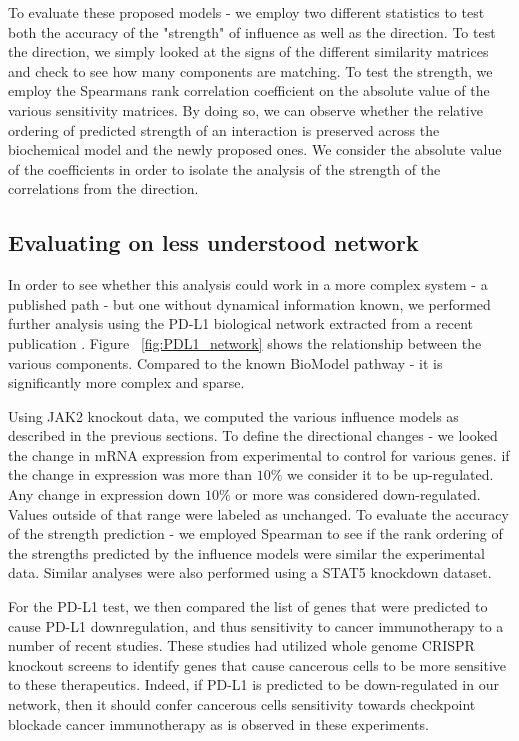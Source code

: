 \documentclass{article}
\begin{document}
To evaluate these proposed models - we employ two different statistics to test both the accuracy of the "strength" of influence as well as the direction. To test the direction, we simply looked at the signs of the different similarity matrices and check to see how many components are matching. To test the strength, we employ the Spearmans rank correlation coefficient on the absolute value of the various sensitivity matrices. By doing so, we can observe whether the relative ordering of predicted strength of an interaction is preserved across the biochemical model and the newly proposed ones. We consider the absolute value of the coefficients in order to isolate the analysis of the strength of the correlations from the direction.  



\subsection{Evaluating on less understood network}
In order to see whether this analysis could work in a more complex system - a published path - but one without dynamical information known, we performed further analysis using the PD-L1 biological network extracted from a recent publication \cite{ritprajak2015intrinsic}.  Figure ~\ref{fig:PDL1_network} shows the relationship between the various components. Compared to the known BioModel pathway - it is significantly more complex and sparse. 

Using JAK2 knockout data, we computed the various influence models as described in the previous sections. To define the directional changes - we looked the change in mRNA expression from experimental to control for various genes. if the change in expression was more than $10\%$ we consider it to be up-regulated. Any change in expression down $10\%$ or more was considered down-regulated. Values outside of that range were labeled as unchanged. To evaluate the accuracy of the strength prediction - we employed Spearman to see if the rank ordering of the strengths predicted by the influence models were similar the experimental data. Similar analyses were also performed using a STAT5 knockdown dataset.

For the PD-L1 test, we then compared the list of genes that were predicted to cause PD-L1 downregulation, and thus sensitivity to cancer immunotherapy to a number of recent studies. These studies had utilized whole genome CRISPR knockout screens to identify genes that cause cancerous cells to be more sensitive to these therapeutics. Indeed, if PD-L1 is predicted to be down-regulated in our network, then it should confer cancerous cells sensitivity towards checkpoint blockade cancer immunotherapy as is observed in these experiments.
\end{document}
